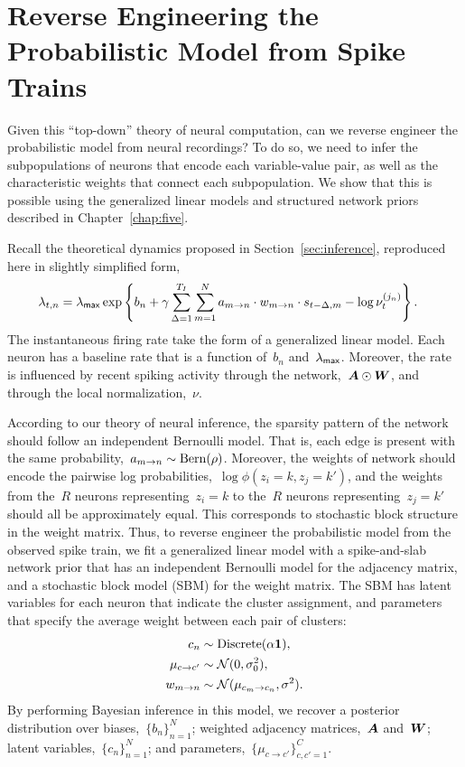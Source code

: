 \section{Reverse Engineering the Probabilistic Model from Spike Trains}
\label{sec:reverse_engineering}

Given this ``top-down'' theory of neural computation, can we reverse
engineer the probabilistic model from neural recordings? To do so, we
need to infer the subpopulations of neurons that encode each
variable-value pair, as well as the characteristic weights that
connect each subpopulation.  We show that this is possible using the
generalized linear models and structured network priors described in
Chapter~\ref{chap:five}.

Recall the theoretical dynamics proposed in Section~\ref{sec:inference},
 reproduced here in slightly simplified form,
\begin{align*}
  \lambda_{t,n} &= \lambda_{\mathsf{max}}
  \exp \left \{b_n + \gamma \sum_{\Delta=1}^{T_I} \sum_{m=1}^N a_{m \to n} \cdot w_{m \to n} \cdot s_{t-\Delta,m}
  - \log \nu_t^{(j_n)} \right \}.
\end{align*}
The instantaneous firing rate take the form of a generalized linear model.
Each neuron has a baseline rate that is a function of~$b_n$ and~$\lambda_{\mathsf{max}}$.
Moreover, the rate is influenced by recent spiking activity through
the network,~$\boldsymbol{A} \odot \boldsymbol{W}$, and through the local normalization,~$\nu$. 

According to our theory of neural inference, the sparsity pattern of
the network should follow an independent Bernoulli model. That is,
each edge is present with the same probability,~${a_{m \to n} \sim
  \mathrm{Bern}(\rho)}$.  Moreover, the weights of network should
encode the pairwise log probabilities,~${\log \phi(z_i=k, z_j=k')}$,
and the weights from the~$R$ neurons representing~${z_i=k}$ to the~$R$
neurons representing~${z_j=k'}$ should all be approximately
equal. This corresponds to stochastic block structure in the weight
matrix. Thus, to reverse engineer the probabilistic model from the
observed spike train, we fit a generalized linear model with a
spike-and-slab network prior that has an independent Bernoulli model
for the adjacency matrix, and a stochastic block model (SBM) for the
weight matrix. The SBM has latent variables for each neuron that
indicate the cluster assignment, and parameters that specify the
average weight between each pair of clusters:
\begin{align*}
  c_n & \sim \mathrm{Discrete}(\alpha \boldsymbol{1}), \\
  \mu_{c \to c'} &\sim \mathcal{N}(0, \sigma_0^2), \\
  w_{m \to n} &\sim \mathcal{N}(\mu_{c_m \to c_n}, \sigma^2).
\end{align*}
By performing Bayesian inference in this model, we recover a posterior
distribution over biases,~$\{b_n\}_{n=1}^N$; weighted adjacency
matrices,~$\boldsymbol{A}$ and~$\boldsymbol{W}$; latent variables,~$\{c_n\}_{n=1}^N$; and
parameters,~$\{\mu_{c \to c'}\}_{c,c'=1}^C$.

